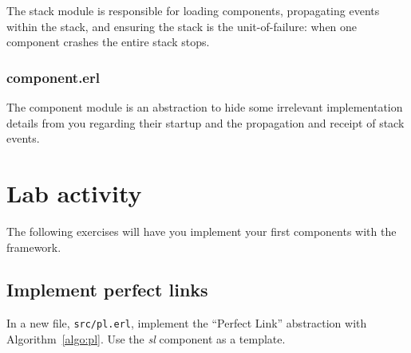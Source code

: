 \documentclass[a4paper]{article}
\begin{document}
The stack module is responsible for loading components, propagating events
within the stack, and ensuring the stack is the unit-of-failure: when one
component crashes the entire stack stops.


\subsubsection{component.erl} %
\label{sub:component_erl}

The component module is an abstraction to hide some irrelevant implementation
details from you regarding their startup and the propagation and receipt of
stack events.





\section{Lab activity} %
\label{sec:lab_activity}

The following exercises will have you implement your first components with the
framework.

\subsection{Implement perfect links} %
\label{sub:implement_pl}

In a new file, \verb!src/pl.erl!, implement the ``Perfect Link'' abstraction
with Algorithm~\ref{algo:pl}. Use the \emph{sl} component as a template.


%
%
%
\end{document}
